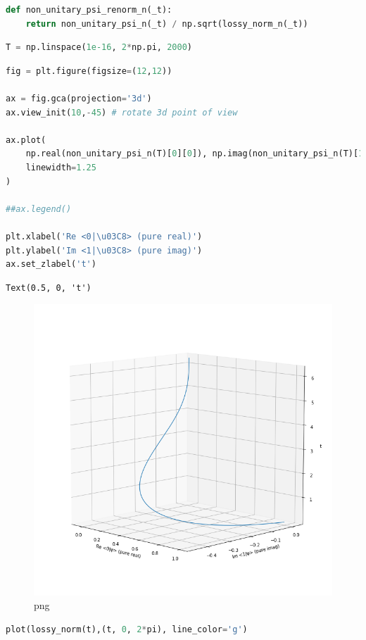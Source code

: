 \begin{lstlisting}[language=Python]
def non_unitary_psi_renorm_n(_t):
    return non_unitary_psi_n(_t) / np.sqrt(lossy_norm_n(_t))
\end{lstlisting}

\begin{lstlisting}[language=Python]
T = np.linspace(1e-16, 2*np.pi, 2000)
\end{lstlisting}

\begin{lstlisting}[language=Python]
fig = plt.figure(figsize=(12,12))

ax = fig.gca(projection='3d')
ax.view_init(10,-45) # rotate 3d point of view

ax.plot(
    np.real(non_unitary_psi_n(T)[0][0]), np.imag(non_unitary_psi_n(T)[1][0]), T,
    linewidth=1.25
)

##ax.legend()

plt.xlabel('Re <0|\u03C8> (pure real)')
plt.ylabel('Im <1|\u03C8> (pure imag)')
ax.set_zlabel('t')
\end{lstlisting}

\begin{lstlisting}
Text(0.5, 0, 't')
\end{lstlisting}

\begin{figure}
\centering
\includegraphics[width=0.66\linewidth]{output_29_1.png}
\caption[]{png}
\end{figure}

\begin{lstlisting}[language=Python]
plot(lossy_norm(t),(t, 0, 2*pi), line_color='g')
\end{lstlisting}


